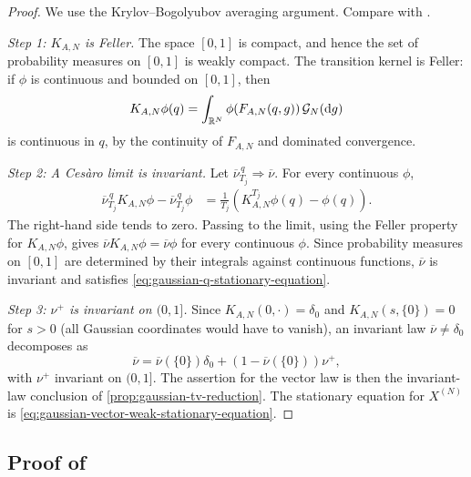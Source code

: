 \documentclass[11pt,reqno,a4paper]{article}
\begin{document}
\begin{proof}
  We use the Krylov--Bogolyubov averaging argument. Compare with
  \cite{kryloff-bogoliouboff1937}.

  \emph{Step 1: $K_{A,N}$ is Feller.}
  The space $[0,1]$ is compact, and hence the set of probability measures on
  $[0,1]$ is weakly compact. The transition kernel is
  Feller: if $\phi$ is continuous and bounded on $[0,1]$, then
  \begin{equation*}
    K_{A,N}\phi(q)
    =
    \int_{\R^N}
    \phi\left(F_{A,N}(q,g)\right)\,\mathcal G_N(\mathrm{d}g)
  \end{equation*}
  is continuous in $q$, by the continuity of $F_{A,N}$ and dominated
  convergence.

  \emph{Step 2: A Ces\`aro limit is invariant.}
  Let $\overline\nu_{T_j}^{\,q}\Rightarrow\overline\nu$. For every continuous
  $\phi$,
  \begin{align*}
    \overline\nu_{T_j}^{\,q}K_{A,N}\phi
    -
    \overline\nu_{T_j}^{\,q}\phi
    &=
    \frac1{T_j}
    \left(
      K_{A,N}^{T_j}\phi(q)-\phi(q)
    \right).
  \end{align*}
  The right-hand side tends to zero. Passing to the limit, using the Feller
  property for $K_{A,N}\phi$, gives
  $\overline\nu K_{A,N}\phi=\overline\nu\phi$ for every continuous $\phi$.
  Since probability measures on $[0,1]$ are determined by their integrals
  against continuous functions, $\overline\nu$ is invariant and satisfies
  \cref{eq:gaussian-q-stationary-equation}.

  \emph{Step 3: $\nu^+$ is invariant on $(0,1]$.}
  Since $K_{A,N}(0,\cdot)=\delta_0$ and
  $K_{A,N}(s,\{0\})=0$ for $s>0$ (all Gaussian coordinates would have to
  vanish), an invariant law
  $\overline\nu\neq\delta_0$ decomposes as
  \begin{equation*}
    \overline\nu
    =
    \overline\nu(\{0\})\delta_0
    +
    \left(1-\overline\nu(\{0\})\right)\nu^+,
  \end{equation*}
  with $\nu^+$ invariant on $(0,1]$. The assertion for the vector law is then
  the invariant-law conclusion of \cref{prop:gaussian-tv-reduction}.
  The stationary equation for $X^{(N)}$ is
  \cref{eq:gaussian-vector-weak-stationary-equation}.
\end{proof}

\subsection{Proof of
\texorpdfstring{}
{Proposition~\ref{prop:gaussian-nonzero-invariant-existence}}}
\label{app:common-nonzero-invariant-existence}
\end{document}
